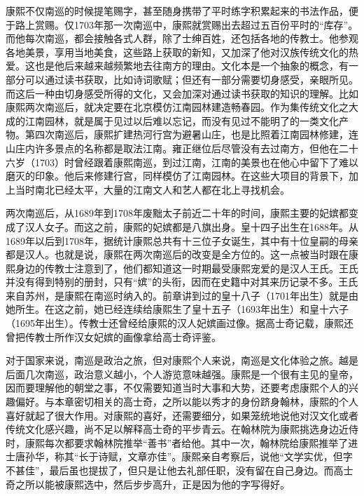 
康熙不仅南巡的时候提笔赐字，甚至随身携带了平时练字积累起来的书法作品，便于路上赏赐。仅1703年那一次南巡中，康熙就赏赐出去超过五百份平时的“库存”。而他每次南巡，都会接触各式人群，除了士绅百姓，还包括各地的传教士。他参观各地美景，享用当地美食，这些路上获取的新知，又加深了他对汉族传统文化的热爱。这也是他后来越来越频繁地去往南方的理由。文化本是一个抽象的概念，有一部分可以通过读书获取，比如诗词歌赋；但还有一部分需要切身感受，亲眼所见。而这后一种由切身感受所得的文化，又会加深对通过读书获取的知识的理解。比如康熙两次南巡后，就决定要在北京模仿江南园林建造畅春园。作为集传统文化之大成的江南园林，就是属于见过以后难以忘记，而没有见过不能明了的一类文化产物。第四次南巡后，康熙扩建热河行宫为避暑山庄，也是比照着江南园林修建，连山庄内许多景点的名称都是取法江南。雍正继位后尽管没有去过南方，但他在二十六岁（1703）时曾经跟着康熙南巡，到过江南，江南的美景也在他心中留下了难以磨灭的印象。他后来修建行宫，同样模仿了江南园林。在这些大项目的背景下，加上当时南北已经太平，大量的江南文人和艺人都在北上寻找机会。



两次南巡后，从1689年到1708年废黜太子前近二十年的时间，康熙主要的妃嫔都变成了汉人女子。而这之前，康熙的妃嫔都是八旗出身。皇十四子出生在1688年。从1689年以后到1708年，据统计康熙总共有十三位子女诞生，其中有十位皇嗣的母亲都是汉人。也就是说，康熙在两次南巡后的改变是全方位的。这一点被当时跟在康熙身边的传教士注意到了，他们都知道这一时期最受康熙宠爱的是汉人王氏。王氏并没有得到特别的册封，只有“嫔”的头衔，因而在史籍中对其来历记录不多。王氏来自苏州，是康熙在南巡时纳入的。前章讲到过的皇十八子（1701年出生）就是由她所生。在这之前，她已经连续给康熙生了皇十五子（1693年出生）和皇十六子（1695年出生）。传教士还曾经给康熙的汉人妃嫔画过像。据高士奇记载，康熙还曾把传教士所作汉女妃嫔的画像拿给高士奇评鉴。



对于国家来说，南巡是政治之旅，但对康熙个人来说，南巡是文化体验之旅。越是后面几次南巡，政治意义越小，个人游览意味越强。康熙是一个很有主见的皇帝，因而要理解他的朝堂之事，不仅需要知道当时大事和大势，还要考虑康熙个人的兴趣偏好。与本章密切相关的高士奇，之所以能以秀才的身份跻身翰林，康熙的个人喜好就起了很大作用。对康熙的喜好，还需要细分，如果笼统地说他对汉文化或者传统文化感兴趣，尚不足以解释高士奇的平步青云。在翰林院为康熙挑选身边近侍时，康熙每次都要求翰林院推举“善书”者给他。其中一次，翰林院给康熙推举了进士唐孙华，称其“长于诗赋，文章亦佳”。康熙亲自考察后，说他“文学实优，但字不甚佳”，最后虽也提拔了，但只是让他去礼部任职，没有留在自己身边。而高士奇之所以能被康熙选中，然后步步高升，正是因为他的字写得好。


